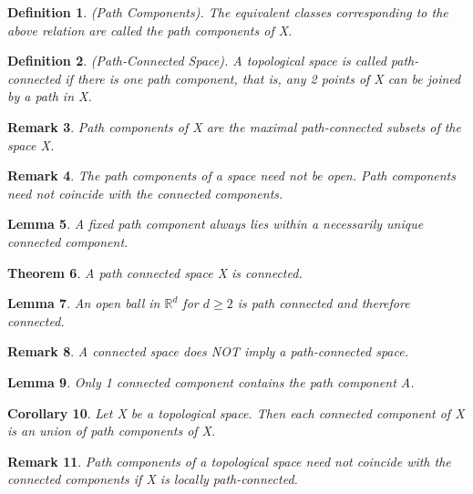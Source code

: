 \documentclass[twoside]{article}
\newcounter{lecnum}
\newtheorem{theorem}{Theorem}[lecnum]
\newtheorem{lemma}[theorem]{Lemma}
\newtheorem{corollary}[theorem]{Corollary}
\newtheorem{definition}[theorem]{Definition}
\newtheorem{remark}[theorem]{Remark}
\begin{document}
\begin{definition}(Path Components). The equivalent classes corresponding to the above relation are called the path components of X.
\end{definition}

\begin{definition}(Path-Connected Space). A topological space is called path-connected if there is one path component, that is, any 2 points of X can be joined by a path in X.
\end{definition}

\begin{remark}Path components of X are the maximal path-connected subsets of the space X.
\end{remark}

\begin{remark}The path components of a space need not be open. Path components need not coincide with the connected components.
\end{remark}

\begin{lemma}A fixed path component always lies within a necessarily unique connected component.
\end{lemma}

\begin{theorem}A path connected space X is connected.
\end{theorem}

\begin{lemma}An open ball in $\mathbb{R}^d$ for $d \geq 2$ is path connected and therefore connected.
\end{lemma}

\begin{remark}A connected space does NOT imply a path-connected space.
\end{remark}

\begin{lemma}Only 1 connected component contains the path component A.
\end{lemma}

\begin{corollary}Let X be a topological space. Then each connected component of X is an union of path components of X.
\end{corollary}
\begin{remark}Path components of a topological space need not coincide with the connected components if X is locally path-connected.
\end{remark}
\end{document}
